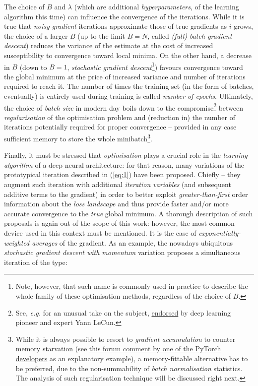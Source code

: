 The choice of $B$ and $\lambda$ (which are additional \textit{hyperparameters}, of the learning algorithm this time) can influence the convergence of the iterations. While it is true that \textit{noisy gradient} iterations approximate those of true gradients as $i$ grows, the choice of a larger $B$ (up to the limit $B=N$, called \textit{(full) batch gradient descent}) reduces the variance of the estimate at the cost of increased susceptibility to convergence toward local minima. On the other hand, a decrease in $B$ (down to $B=1$, \textit{stochastic gradient descent}\footnote{Note, however, that such name is commonly used in practice to describe the whole family of these optimisation methods, regardless of the choice of $B$.}) favours convergence toward the global minimum at the price of increased variance and number of iterations required to reach it. The number of times the training set (in the form of batches, eventually) is entirely used during training is called \textit{number of epochs}. Ultimately, the choice of \textit{batch size} in modern day boils down to the compromise\footnote{See, \textit{e.g.} \cite{MastersLuschi2018RevisitingSB} for an unusual take on the subject,  \href{https://twitter.com/ylecun/status/989610208497360896?lang=en}{endorsed} by deep learning pioneer and expert Yann LeCun.} between \textit{regularisation} of the optimisation problem and (reduction in) the number of iterations potentially required for proper convergence -- provided in any case sufficient memory to store the whole minibatch\footnote{While it is always possible to resort to \textit{gradient accumulation} to counter memory starvation (see \href{https://discuss.pytorch.org/t/why-do-we-need-to-set-the-gradients-manually-to-zero-in-pytorch/4903/20}{this forum comment by one of the PyTorch developers} as an explanatory example), a memory-fittable alternative has to be preferred, due to the non-summability of \textit{batch normalisation} statistics. The analysis of such regularisation technique will be discussed right next.}.

Finally, it must be stressed that \textit{optimisation} plays a crucial role in the \textit{learning algorithm} of a deep neural architecture: for that reason, many variations of the prototypical iteration described in (\ref{eq:1}) have been proposed. Chiefly -- they augment such iteration with additional \textit{iteration variables} (and subsequent additive terms to the gradient) in order to better exploit \textit{greater-than-first} order information about the \textit{loss landscape} and thus provide faster and/or more accurate convergence to the \textit{true} global minimum. A thorough description of such proposals is again out of the scope of this work: however, the most common device used in this context must be mentioned. It is the case of \textit{exponentially-weighted averages} of the gradient. As an example, the nowadays ubiquitous \textit{stochastic gradient descent with momentum} variation proposes a simultaneous iteration of the type:

